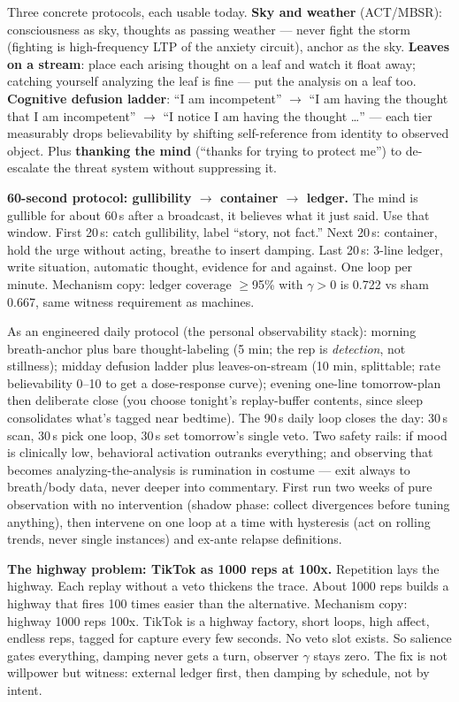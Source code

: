 \documentclass[11pt]{article}
\begin{document}
Three concrete protocols, each usable today. \textbf{Sky and weather} (ACT/MBSR): consciousness as sky, thoughts as passing weather --- never fight the storm (fighting is high-frequency LTP of the anxiety circuit), anchor as the sky. \textbf{Leaves on a stream}: place each arising thought on a leaf and watch it float away; catching yourself analyzing the leaf is fine --- put the analysis on a leaf too. \textbf{Cognitive defusion ladder}: ``I am incompetent'' $\to$ ``I am having the thought that I am incompetent'' $\to$ ``I notice I am having the thought \dots'' --- each tier measurably drops believability by shifting self-reference from identity to observed object. Plus \textbf{thanking the mind} (``thanks for trying to protect me'') to de-escalate the threat system without suppressing it.

\textbf{60-second protocol: gullibility $\to$ container $\to$ ledger.} The mind is gullible for about 60\,s after a broadcast, it believes what it just said. Use that window. First 20\,s: catch gullibility, label ``story, not fact.'' Next 20\,s: container, hold the urge without acting, breathe to insert damping. Last 20\,s: 3-line ledger, write situation, automatic thought, evidence for and against. One loop per minute. Mechanism copy: ledger coverage $\geq$95\% with $\gamma>0$ is 0.722 vs sham 0.667, same witness requirement as machines.

As an engineered daily protocol (the personal observability stack): morning breath-anchor plus bare thought-labeling (5 min; the rep is \emph{detection}, not stillness); midday defusion ladder plus leaves-on-stream (10 min, splittable; rate believability 0--10 to get a dose-response curve); evening one-line tomorrow-plan then deliberate close (you choose tonight's replay-buffer contents, since sleep consolidates what's tagged near bedtime). The 90\,s daily loop closes the day: 30\,s scan, 30\,s pick one loop, 30\,s set tomorrow's single veto. Two safety rails: if mood is clinically low, behavioral activation outranks everything; and observing that becomes analyzing-the-analysis is rumination in costume --- exit always to breath/body data, never deeper into commentary. First run two weeks of pure observation with no intervention (shadow phase: collect divergences before tuning anything), then intervene on one loop at a time with hysteresis (act on rolling trends, never single instances) and ex-ante relapse definitions.

\textbf{The highway problem: TikTok as 1000 reps at 100x.} Repetition lays the highway. Each replay without a veto thickens the trace. About 1000 reps builds a highway that fires 100 times easier than the alternative. Mechanism copy: highway 1000 reps 100x. TikTok is a highway factory, short loops, high affect, endless reps, tagged for capture every few seconds. No veto slot exists. So salience gates everything, damping never gets a turn, observer $\gamma$ stays zero. The fix is not willpower but witness: external ledger first, then damping by schedule, not by intent.
\end{document}
